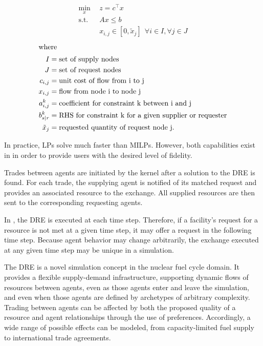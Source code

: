\begin{align}
\min_{x} \: \: & z = c^\top x \\
\text{s.t.} \: \:  & A x \leq b \\
    & x_{i,j} \in [0, \tilde{x}_j] \: \:  \forall i \in I, \forall j \in J
\end{align}
\begin{align}
\intertext{where}
I &= \mbox{set of supply nodes}\nonumber\\
J &= \mbox{set of request nodes}\nonumber\\
c_{i,j} &= \mbox{unit cost of flow from i to j}\nonumber\\
x_{i,j} &= \mbox{flow from node i to node j}\nonumber\\
a^k_{i,j} &= \mbox{coefficient for constraint k between i and j}\nonumber\\
b^k_{s \mid r} &= \mbox{RHS for constraint k for a given supplier or requester}\nonumber\\
\tilde{x}_j &= \mbox{requested quantity of request node j.}\nonumber
\end{align}



In practice, \glspl{LP} solve much faster than
\glspl{MILP}. However, both capabilities exist in \Cyclus in order to
provide users with the desired level of fidelity.

Trades between agents are initiated by the \Cyclus kernel after a solution to
the \gls{DRE} is found. For each trade, the supplying agent is notified of its
matched request and provides an associated resource to the exchange. All
supplied resources are then sent to the corresponding requesting agents.

In \Cyclus, the \gls{DRE} is executed at each time step. Therefore, if a
facility's request for a resource is not met at a given time step, it may offer
a request in the following time step. Because agent behavior may change
arbitrarily, the exchange executed at any given time step may be unique in a
simulation.

The \gls{DRE} is a novel simulation concept in the nuclear fuel cycle domain. It
provides a flexible supply-demand infrastructure, supporting dynamic flows of
resources between agents, even as those agents enter and leave the simulation, and
even when those agents are defined by archetypes of arbitrary complexity. Trading
between agents can be affected by both the
proposed quality of a resource and agent relationships through the use of
preferences. Accordingly, a wide range of possible effects can be
modeled, from capacity-limited fuel supply to international trade agreements.

